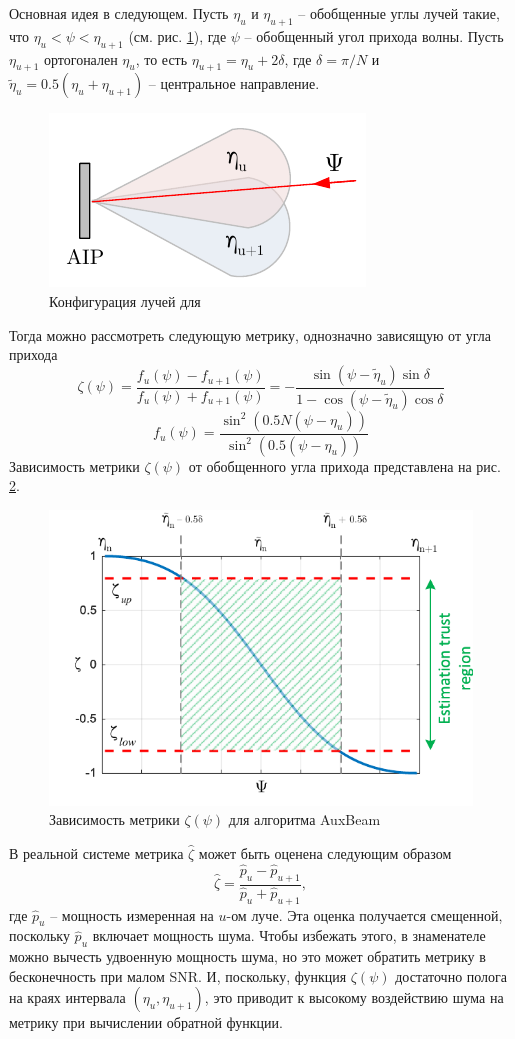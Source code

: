 Основная идея в следующем. Пусть $\eta_u$ и $\eta_{u+1}$ -- обобщенные углы
лучей такие, что $\eta_u<\psi<\eta_{u+1}$ (см. рис. \ref{fig:4.14}), где $\psi$
-- обобщенный угол прихода волны.  Пусть $\eta_{u+1}$ ортогонален $\eta_u$, то
есть $\eta_{u+1} = \eta_u + 2\delta$, где $\delta = \pi/N$  и $\tilde \eta_u =
    0.5 (\eta_u + \eta_{u+1})$ -- центральное направление.
\begin{figure}[h!]
    \centering
    \includegraphics[width=0.5\linewidth]{figs/fig4.14}
    \caption{Конфигурация лучей для \AuxBeam{}}
    \label{fig:4.14}
\end{figure}
Тогда можно рассмотреть следующую метрику, однозначно зависящую от угла прихода
\begin{equation}
    \label{eq:4.37}
    \zeta(\psi) = \frac{f_u(\psi) - f_{u+1}(\psi)}{f_u(\psi) + f_{u+1}(\psi)} = - \frac{\sin(\psi - \tilde \eta_u) \sin \delta}{1 - \cos(\psi - \tilde \eta_u) \cos \delta}
\end{equation}
\begin{equation}
    \label{eq:4.38}
    f_u(\psi) = \frac{\sin^2 (0.5 N (\psi - \eta_u))}{\sin^2(0.5 (\psi - \eta_u))}
\end{equation}
Зависимость метрики $\zeta(\psi)$  от обобщенного угла прихода представлена на
рис. \ref{fig:4.15}.
\begin{figure}[h!]
    \centering
    \includegraphics[width=0.5\linewidth]{figs/fig4.15}
    \caption{Зависимость метрики $\zeta(\psi)$ для алгоритма AuxBeam}
    \label{fig:4.15}
\end{figure}
В реальной системе метрика $\hat \zeta$ может быть оценена следующим образом
\begin{equation}
    \label{eq:4.39}
    \hat \zeta = \frac{\hat p_u - \hat p_{u+1}}{ \hat p_u + \hat p_{u+1} },
\end{equation}
где $\hat p_u$ -- мощность измеренная на $u$-ом луче. Эта оценка получается смещенной, поскольку $\hat p_u$ включает мощность шума.
Чтобы избежать этого, в знаменателе можно вычесть удвоенную мощность шума, но это может обратить метрику в бесконечность при малом SNR.
И, поскольку, функция $\zeta(\psi)$ достаточно полога на краях интервала $(\eta_u, \eta_{u+1})$, это приводит к высокому
воздействию шума на метрику при вычислении обратной функции.

